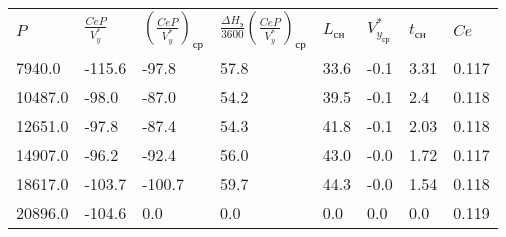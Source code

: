 \begin{tabular}{llllllll}
$P$ & $\frac{CeP}{V_y^*}$ & $(\frac{CeP}{V_y^*})_{ср}$ & $\frac{\Delta H_э}{3600}(\frac{CeP}{V_y^*})_{ср}$ & $L_{сн}$ & $V_{y_{ср}}^*$ & $t_{сн}$ & $Ce$ \\
7940.0 & -115.6 & -97.8 & 57.8 & 33.6 & -0.1 & 3.31 & 0.117 \\
10487.0 & -98.0 & -87.0 & 54.2 & 39.5 & -0.1 & 2.4 & 0.118 \\
12651.0 & -97.8 & -87.4 & 54.3 & 41.8 & -0.1 & 2.03 & 0.118 \\
14907.0 & -96.2 & -92.4 & 56.0 & 43.0 & -0.0 & 1.72 & 0.117 \\
18617.0 & -103.7 & -100.7 & 59.7 & 44.3 & -0.0 & 1.54 & 0.118 \\
20896.0 & -104.6 & 0.0 & 0.0 & 0.0 & 0.0 & 0.0 & 0.119 \\
\end{tabular}
